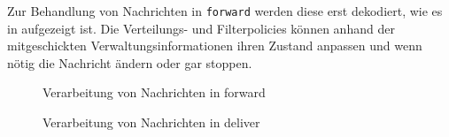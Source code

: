 Zur Behandlung von Nachrichten in \texttt{forward} werden diese erst dekodiert, wie es in  aufgezeigt ist. Die Verteilungs- und Filterpolicies können anhand der mitgeschickten Verwaltungsinformationen ihren Zustand anpassen und wenn nötig die Nachricht ändern oder gar stoppen.

\begin{figure}[htbp]
\centering
{}
\caption{Verarbeitung von Nachrichten in forward}
\label{fig:processing_forward}
\end{figure}

\begin{figure}[htbp]
\centering
{}
\caption{Verarbeitung von Nachrichten in deliver}
\label{fig:processing_deliver}
\end{figure}

